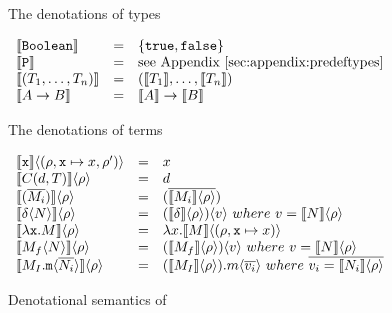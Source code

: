 \begin{figure}[h]

The denotations of \corelang types

\begin{center}
  \(\begin{array}{ l c l }
  \Denot{\lst{Boolean}} & = & \{ \lst{true}, \lst{false} \}  \\	
  \Denot{\lst{P}} & = & \text{see Appendix~\ref{sec:appendix:predeftypes}} \\	
  \Denot{(T_1,\dots,T_n)} & = & (\Denot{T_1},\dots,\Denot{T_n})  \\	
  \Denot{A \to B} & = & \Denot{A} \to \Denot{B}  \\	
  \end{array}\)
\end{center}

The denotations of \corelang terms

\begin{center}
  \(\begin{array}{ l c l }
  \Apply{ \Denot{\lst{x}}			}{(\rho,\lst{x}\mapsto x, \rho')} & = & x \\	
  \Apply{ \Denot{C(d, T)} 			}{\rho} & = & d \\	
  \Apply{ \Denot{(\Ov{M_i})} 		}{\rho} & = & (\Ov{ \Apply{\Denot{M_i}}{\rho} }) \\	

  \Apply{ \Denot{\Apply{\delta}{N}} }{\rho} & = 
		& \Apply{ (\Apply{\Denot{\delta}}{\rho}) }{ v }~where~v = \Apply{\Denot{N}}{\rho} \\	

  \Apply{ \Denot{\Lam{\lst{x}}{M}}	}{\rho} & = 
		& \Lam{x}{ \Apply{\Denot{M}}{(\rho, \lst{x}\mapsto x)} } \\	

  \Apply{ \Denot{\Apply{M_f}{N}}	}{\rho} & = 
		& \Apply{ (\Apply{\Denot{M_f}}{\rho}) }{ v }~where~v = \Apply{\Denot{N}}{\rho} \\	

  \Apply{ \Denot{ \Apply{M_I.\lst{m}}{\Ov{N_i}} }	}{\rho} & = 
		& \Apply{ (\Apply{\Denot{M_I}}{\rho}).m }{ \Ov{v_i} }~where~\Ov{v_i = \Apply{\Denot{N_i}}{\rho}} \\	
  \end{array}\)
\end{center}

\caption{Denotational semantics of \corelang}
\label{fig:denotations}
\end{figure}